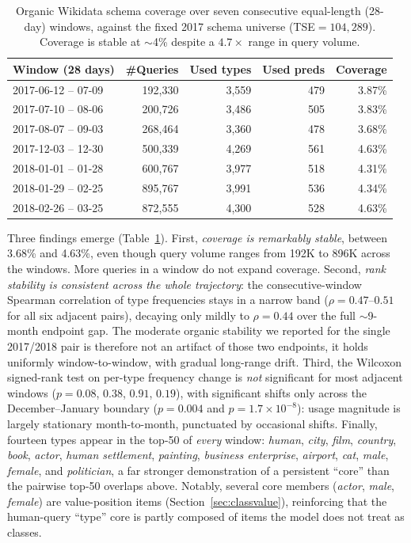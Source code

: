 \documentclass[sw]{iosart2x}
\begin{document}
\begin{table}[ht]
\centering
\caption{Organic Wikidata schema coverage over seven consecutive equal-length (28-day) windows, against the fixed 2017 schema universe (TSE${=}104{,}289$). Coverage is stable at $\sim$4\% despite a $4.7\times$ range in query volume.}
\label{tab:temporaltraj}
\begin{tabular}{l|r|r|r|r}
\hline
Window (28 days) & \#Queries & Used types & Used preds & Coverage \\
\hline
2017-06-12 -- 07-09 & 192,330 & 3,559 & 479 & 3.87\% \\
2017-07-10 -- 08-06 & 200,726 & 3,486 & 505 & 3.83\% \\
2017-08-07 -- 09-03 & 268,464 & 3,360 & 478 & 3.68\% \\
2017-12-03 -- 12-30 & 500,339 & 4,269 & 561 & 4.63\% \\
2018-01-01 -- 01-28 & 600,767 & 3,977 & 518 & 4.31\% \\
2018-01-29 -- 02-25 & 895,767 & 3,991 & 536 & 4.34\% \\
2018-02-26 -- 03-25 & 872,555 & 4,300 & 528 & 4.63\% \\
\hline
\end{tabular}
\end{table}

Three findings emerge (Table~\ref{tab:temporaltraj}). First, \emph{coverage is remarkably stable}, between 3.68\% and 4.63\%, even though query volume ranges from 192K to 896K across the windows. More queries in a window do not expand coverage. Second, \emph{rank stability is consistent across the whole trajectory}: the consecutive-window Spearman correlation of type frequencies stays in a narrow band ($\rho = 0.47$--$0.51$ for all six adjacent pairs), decaying only mildly to $\rho = 0.44$ over the full $\sim$9-month endpoint gap. The moderate organic stability we reported for the single 2017/2018 pair is therefore not an artifact of those two endpoints, it holds uniformly window-to-window, with gradual long-range drift. Third, the Wilcoxon signed-rank test on per-type frequency change is \emph{not} significant for most adjacent windows ($p = 0.08$, $0.38$, $0.91$, $0.19$), with significant shifts only across the December--January boundary ($p = 0.004$ and $p = 1.7{\times}10^{-8}$): usage magnitude is largely stationary month-to-month, punctuated by occasional shifts. Finally, fourteen types appear in the top-50 of \emph{every} window: \emph{human}, \emph{city}, \emph{film}, \emph{country}, \emph{book}, \emph{actor}, \emph{human settlement}, \emph{painting}, \emph{business enterprise}, \emph{airport}, \emph{cat}, \emph{male}, \emph{female}, and \emph{politician}, a far stronger demonstration of a persistent ``core'' than the pairwise top-50 overlaps above. Notably, several core members (\emph{actor}, \emph{male}, \emph{female}) are value-position items (Section~\ref{sec:classvalue}), reinforcing that the human-query ``type'' core is partly composed of items the model does not treat as classes.
\end{document}
